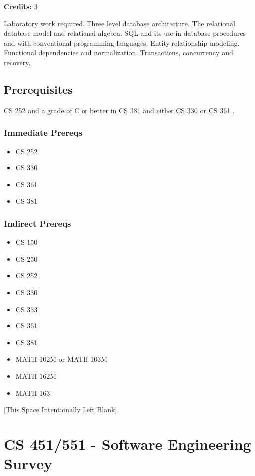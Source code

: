 \documentclass[]{article}
\providecommand{\tightlist}{%
  \setlength{\itemsep}{0pt}\setlength{\parskip}{0pt}}
\newcommand{\pagebreakhere}{
\vspace*{\fill}
\begin{center}
[This Space Intentionally Left Blank]
\end{center}
\vspace*{\fill}
\newpage
}
\begin{document}
\textbf{Credits:} 3

Laboratory work required. Three level database architecture. The
relational database model and relational algebra. SQL and its use in
database procedures and with conventional programming languages. Entity
relationship modeling. Functional dependencies and normalization.
Transactions, concurrency and recovery.

\subsection{Prerequisites}\label{prerequisites-33}

CS 252 and a grade of C or better in CS 381 and either CS 330 or CS 361
.

\subsubsection{Immediate Prereqs}\label{immediate-prereqs-25}

\begin{itemize}
\tightlist
\item
  CS 252
\item
  CS 330
\item
  CS 361
\item
  CS 381
\end{itemize}

\subsubsection{Indirect Prereqs}\label{indirect-prereqs-25}

\begin{itemize}
\tightlist
\item
  CS 150
\item
  CS 250
\item
  CS 252
\item
  CS 330
\item
  CS 333
\item
  CS 361
\item
  CS 381
\item
  MATH 102M or MATH 103M
\item
  MATH 162M
\item
  MATH 163
\end{itemize}

\pagebreakhere
\section{CS 451/551 - Software Engineering
Survey}\label{cs-451551---software-engineering-survey}
\end{document}
